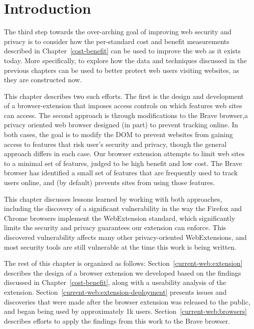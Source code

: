 \section{Introduction}
\label{current-web:current-web}

The third step towards the over-arching goal of improving web security and
privacy is to consider how the per-standard cost and benefit measurements
described in Chapter~\ref{cost-benefit} can be used to improve the web as it
exists today.  More specifically, to explore how the data and techniques
discussed in the previous chapters can be used to better protect web users
visiting websites, as they are constructed now.

This chapter describes two such efforts.  The first is the design and development
of a browser-extension that imposes access controls on which \WAPI features
web sites can access.  The second approach is through modifications to the Brave
browser,a privacy oriented web browser designed (in part) to prevent tracking online.
In both cases, the goal is to modify the DOM to prevent websites from gaining
access to features that risk user's security and privacy, though the general
approach differs in each case. Our browser extension attempts to limit web
sites to a minimal set of features, judged to be high benefit and low cost.
The Brave browser has identified a small set of \WAPI features that
are frequently used to track users online, and (by default) prevents sites
from using those features.

This chapter discusses lessons learned by working with both approaches, including
the discovery of a significant vulnerability in the way the Firefox and Chrome
browsers implement the WebExtension standard, which significantly limits
the security and privacy guarantees our extension can enforce.  This discovered
vulnerability affects many other privacy-oriented WebExtensions, and most
security tools are still vulnerable at the time this work is being written.

The rest of this chapter is organized as follows:  Section~\ref{current-web:extension}
describes the design of a browser extension we developed based on the findings
discussed in Chapter~\ref{cost-benefit}, along with a useability analysis of
the extension.  Section~\ref{current-web:extension-deployment} presents
issues and discoveries that were made after the browser extension was released
to the public, and began being used by approximately 1k users.
Section~\ref{current-web:browsers} describes efforts to apply the findings from
this work to the Brave browser.